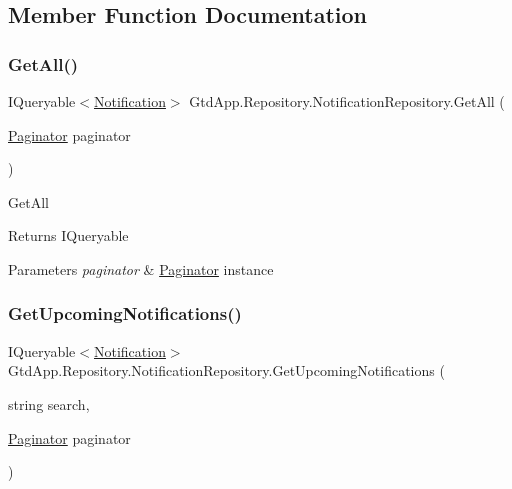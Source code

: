 \subsection{Member Function Documentation}
\mbox{\label{class_gtd_app_1_1_repository_1_1_notification_repository_a5bc417471e17a2b2730f92fdf207426c}} 
\subsubsection{\texorpdfstring{Get\+All()}{GetAll()}}
{\footnotesize\ttfamily I\+Queryable$<$\mbox{\hyperlink{class_gtd_app_1_1_data_1_1_notification}{Notification}}$>$ Gtd\+App.\+Repository.\+Notification\+Repository.\+Get\+All (\begin{DoxyParamCaption}\item[{\mbox{\hyperlink{class_gtd_app_1_1_repository_1_1_paginator}{Paginator}}}]{paginator }\end{DoxyParamCaption})}



Get\+All 

\begin{DoxyReturn}{Returns}
I\+Queryable
\end{DoxyReturn}

\begin{DoxyParams}{Parameters}
{\em paginator} & \mbox{\hyperlink{class_gtd_app_1_1_repository_1_1_paginator}{Paginator}} instance\\
\hline
\end{DoxyParams}
\mbox{\label{class_gtd_app_1_1_repository_1_1_notification_repository_a58da3bf4239487b5553b8de26c70ca3d}} 
\subsubsection{\texorpdfstring{Get\+Upcoming\+Notifications()}{GetUpcomingNotifications()}}
{\footnotesize\ttfamily I\+Queryable$<$\mbox{\hyperlink{class_gtd_app_1_1_data_1_1_notification}{Notification}}$>$ Gtd\+App.\+Repository.\+Notification\+Repository.\+Get\+Upcoming\+Notifications (\begin{DoxyParamCaption}\item[{string}]{search,  }\item[{\mbox{\hyperlink{class_gtd_app_1_1_repository_1_1_paginator}{Paginator}}}]{paginator }\end{DoxyParamCaption})}



